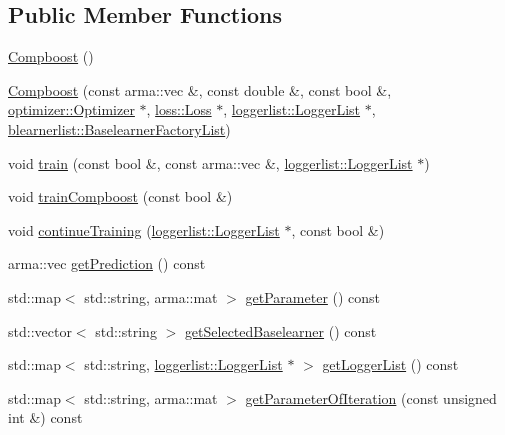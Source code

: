 \subsection*{Public Member Functions}
\begin{DoxyCompactItemize}
\item 
\hyperlink{classcboost_1_1_compboost_a5117b7b8cf0a424e736f6833bc5c3a68}{Compboost} ()
\item 
\hyperlink{classcboost_1_1_compboost_a24b98d64e9aac2a7a8ec4e64a49a1f7c}{Compboost} (const arma\+::vec \&, const double \&, const bool \&, \hyperlink{classoptimizer_1_1_optimizer}{optimizer\+::\+Optimizer} $\ast$, \hyperlink{classloss_1_1_loss}{loss\+::\+Loss} $\ast$, \hyperlink{classloggerlist_1_1_logger_list}{loggerlist\+::\+Logger\+List} $\ast$, \hyperlink{classblearnerlist_1_1_baselearner_factory_list}{blearnerlist\+::\+Baselearner\+Factory\+List})
\item 
void \hyperlink{classcboost_1_1_compboost_aa898572eb2c83e0b95c12788a859333b}{train} (const bool \&, const arma\+::vec \&, \hyperlink{classloggerlist_1_1_logger_list}{loggerlist\+::\+Logger\+List} $\ast$)
\item 
void \hyperlink{classcboost_1_1_compboost_a52ea04dec53c68865fdc4a79461d17cb}{train\+Compboost} (const bool \&)
\item 
void \hyperlink{classcboost_1_1_compboost_a191aa22dbfcc3d2e878ef75c0b196d07}{continue\+Training} (\hyperlink{classloggerlist_1_1_logger_list}{loggerlist\+::\+Logger\+List} $\ast$, const bool \&)
\item 
arma\+::vec \hyperlink{classcboost_1_1_compboost_a405c6b88de5b053fefdb24742791da4e}{get\+Prediction} () const
\item 
std\+::map$<$ std\+::string, arma\+::mat $>$ \hyperlink{classcboost_1_1_compboost_a7b90eaa8107f91806b09ceedf8581537}{get\+Parameter} () const
\item 
std\+::vector$<$ std\+::string $>$ \hyperlink{classcboost_1_1_compboost_ac66d4490e6539832d4d304a86db746dc}{get\+Selected\+Baselearner} () const
\item 
std\+::map$<$ std\+::string, \hyperlink{classloggerlist_1_1_logger_list}{loggerlist\+::\+Logger\+List} $\ast$ $>$ \hyperlink{classcboost_1_1_compboost_a0376256bdfde1a50b420ad7412f4b4dd}{get\+Logger\+List} () const
\item 
std\+::map$<$ std\+::string, arma\+::mat $>$ \hyperlink{classcboost_1_1_compboost_a97b02aa81981e08658d896ff9798b5d0}{get\+Parameter\+Of\+Iteration} (const unsigned int \&) const
\item 

\end{DoxyCompactItemize}
